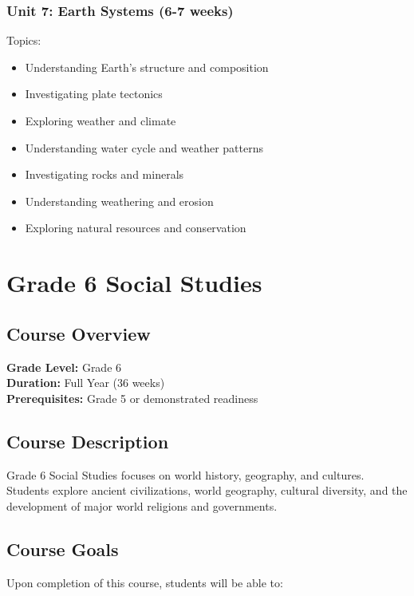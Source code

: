 \documentclass[11pt,letterpaper]{report}
\begin{document}
\subsection{Unit 7: Earth Systems (6-7 weeks)}

Topics:
\begin{itemize}
\item Understanding Earth's structure and composition
\item Investigating plate tectonics
\item Exploring weather and climate
\item Understanding water cycle and weather patterns
\item Investigating rocks and minerals
\item Understanding weathering and erosion
\item Exploring natural resources and conservation
\end{itemize}

\chapter{Grade 6 Social Studies}

\section{Course Overview}

\textbf{Grade Level:} Grade 6\\
\textbf{Duration:} Full Year (36 weeks)\\
\textbf{Prerequisites:} Grade 5 or demonstrated readiness

\section{Course Description}

Grade 6 Social Studies focuses on world history, geography, and cultures. Students explore ancient civilizations, world geography, cultural diversity, and the development of major world religions and governments.

\section{Course Goals}

Upon completion of this course, students will be able to:
\end{document}
